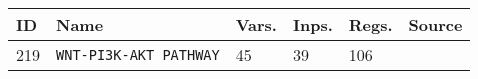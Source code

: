 \documentclass{article}
\begin{document}
\begin{center}
	\begin{tabular}{ | C{16pt} | C{149pt} | C{25pt} | C{25pt} | C{25pt} | C{36pt} | }
		\hline
		ID & Name & Vars. & Inps. & Regs. & Source \\ 	 	
		 & \texttt{WNT-PI3K-AKT PATHWAY} & 45 & 39 & 106 & \cite{bbm-213-214-215-216-217-218-219} \\
		\hline
	\end{tabular}


\end{center}



\end{document}
